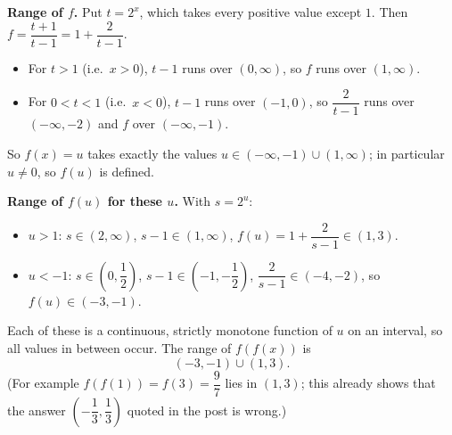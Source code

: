 \textbf{Range of $f$.} Put $t=2^x$, which takes every positive value except $1$. Then $f=\dfrac{t+1}{t-1}=1+\dfrac{2}{t-1}$.
\begin{itemize}
\item For $t>1$ (i.e.\ $x>0$), $t-1$ runs over $(0,\infty)$, so $f$ runs over $(1,\infty)$.
\item For $0<t<1$ (i.e.\ $x<0$), $t-1$ runs over $(-1,0)$, so $\dfrac{2}{t-1}$ runs over $(-\infty,-2)$ and $f$ over $(-\infty,-1)$.
\end{itemize}
So $f(x)=u$ takes exactly the values $u\in(-\infty,-1)\cup(1,\infty)$; in particular $u\ne0$, so $f(u)$ is defined.

\textbf{Range of $f(u)$ for these $u$.} With $s=2^u$:
\begin{itemize}
\item $u>1$: $s\in(2,\infty)$, $s-1\in(1,\infty)$, $f(u)=1+\dfrac{2}{s-1}\in(1,3)$.
\item $u<-1$: $s\in\left(0,\dfrac{1}{2}\right)$, $s-1\in\left(-1,-\dfrac{1}{2}\right)$, $\dfrac{2}{s-1}\in(-4,-2)$, so $f(u)\in(-3,-1)$.
\end{itemize}
Each of these is a continuous, strictly monotone function of $u$ on an interval, so all values in between occur. The range of $f(f(x))$ is
\[
\boxed{(-3,-1)\cup(1,3)} .
\]
(For example $f(f(1))=f(3)=\dfrac{9}{7}$ lies in $(1,3)$; this already shows that the answer $\left(-\dfrac{1}{3},\dfrac{1}{3}\right)$ quoted in the post is wrong.)
